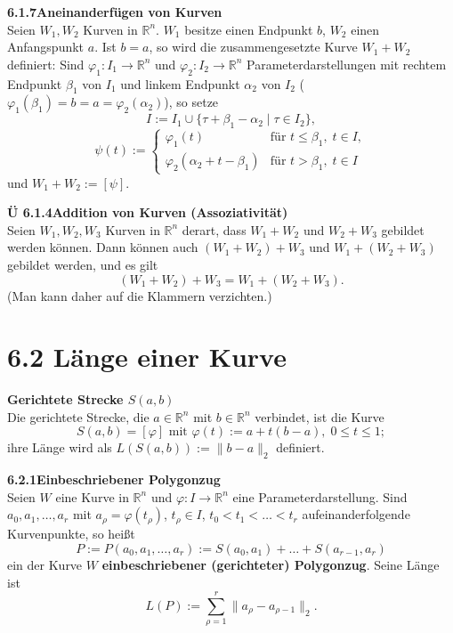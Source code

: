 \documentclass[a4paper,12pt]{article}
\newcommand{\gentry}[3]{%
  \noindent\textbf{#1\quad #2}\nopagebreak\\[0.2em]
  #3\par\smallskip
}
\begin{document}
\gentry{6.1.7}{Aneinanderfügen von Kurven}{%
  Seien $W_1, W_2$ Kurven in $\mathbb{R}^n$. $W_1$ besitze einen Endpunkt $b$,
  $W_2$ einen Anfangspunkt $a$. Ist $b = a$, so wird die zusammengesetzte Kurve
  $W_1 + W_2$ definiert: Sind $\varphi_1 : I_1 \longrightarrow \mathbb{R}^n$ und
  $\varphi_2 : I_2 \longrightarrow \mathbb{R}^n$ Parameterdarstellungen mit rechtem
  Endpunkt $\beta_1$ von $I_1$ und linkem Endpunkt $\alpha_2$ von $I_2$
  ($\varphi_1(\beta_1) = b = a = \varphi_2(\alpha_2)$), so setze
  \[
    I := I_1 \cup \{\tau + \beta_1 - \alpha_2 \mid \tau \in I_2\},
  \]
  \[
    \psi(t) := \begin{cases} \varphi_1(t) & \text{für } t \leq \beta_1,\; t \in I,\\
                             \varphi_2(\alpha_2 + t - \beta_1) & \text{für } t > \beta_1,\; t \in I\end{cases}
  \]
  und $W_1 + W_2 := [\psi]$.
}

\gentry{Ü 6.1.4}{Addition von Kurven (Assoziativität)}{%
  Seien $W_1, W_2, W_3$ Kurven in $\mathbb{R}^n$ derart, dass $W_1 + W_2$ und $W_2 + W_3$
  gebildet werden können. Dann können auch $(W_1 + W_2) + W_3$ und $W_1 + (W_2 + W_3)$
  gebildet werden, und es gilt
  \[
    (W_1 + W_2) + W_3 = W_1 + (W_2 + W_3).
  \]
  (Man kann daher auf die Klammern verzichten.)
}

\section*{6.2 \quad Länge einer Kurve}

\gentry{}{Gerichtete Strecke $S(a,b)$}{%
  Die gerichtete Strecke, die $a \in \mathbb{R}^n$ mit $b \in \mathbb{R}^n$ verbindet,
  ist die Kurve
  \[
    S(a,b) = [\varphi] \text{ mit } \varphi(t) := a + t(b-a),\; 0 \leq t \leq 1;
  \]
  ihre Länge wird als $L(S(a,b)) := \|b - a\|_2$ definiert.
}

\gentry{6.2.1}{Einbeschriebener Polygonzug}{%
  Seien $W$ eine Kurve in $\mathbb{R}^n$ und $\varphi : I \longrightarrow \mathbb{R}^n$ eine
  Parameterdarstellung. Sind $a_0, a_1, \ldots, a_r$ mit $a_\rho = \varphi(t_\rho)$,
  $t_\rho \in I$, $t_0 < t_1 < \ldots < t_r$ aufeinanderfolgende Kurvenpunkte, so heißt
  \[
    P := P(a_0, a_1, \ldots, a_r) := S(a_0, a_1) + \ldots + S(a_{r-1}, a_r)
  \]
  ein der Kurve $W$ \textbf{einbeschriebener (gerichteter) Polygonzug}. Seine Länge ist
  \[
    L(P) := \sum_{\rho=1}^{r} \|a_\rho - a_{\rho-1}\|_2.
  \]
}
\end{document}
